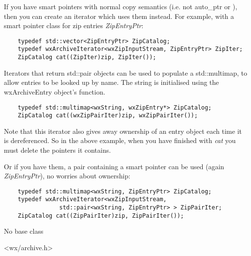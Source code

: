 If you have smart pointers with normal copy semantics (i.e. not auto\_ptr
or ), then you can create an iterator
which uses them instead.  For example, with a smart pointer class for
zip entries {\it ZipEntryPtr}:

\begin{verbatim}
    typedef std::vector<ZipEntryPtr> ZipCatalog;
    typedef wxArchiveIterator<wxZipInputStream, ZipEntryPtr> ZipIter;
    ZipCatalog cat((ZipIter)zip, ZipIter());

\end{verbatim}

Iterators that return std::pair objects can be used to
populate a std::multimap, to allow entries to be looked
up by name. The string is initialised using the wxArchiveEntry object's
  function.

\begin{verbatim}
    typedef std::multimap<wxString, wxZipEntry*> ZipCatalog;
    ZipCatalog cat((wxZipPairIter)zip, wxZipPairIter());

\end{verbatim}
 
Note that this iterator also gives away ownership of an entry 
object each time it is dereferenced. So in the above example, when
you have finished with {\it cat} you must delete the pointers it contains.

Or if you have them, a pair containing a smart pointer can be used
(again {\it ZipEntryPtr}), no worries about ownership:

\begin{verbatim}
    typedef std::multimap<wxString, ZipEntryPtr> ZipCatalog;
    typedef wxArchiveIterator<wxZipInputStream,
                std::pair<wxString, ZipEntryPtr> > ZipPairIter;
    ZipCatalog cat((ZipPairIter)zip, ZipPairIter());

\end{verbatim}


No base class


<wx/archive.h>


\\
\\

